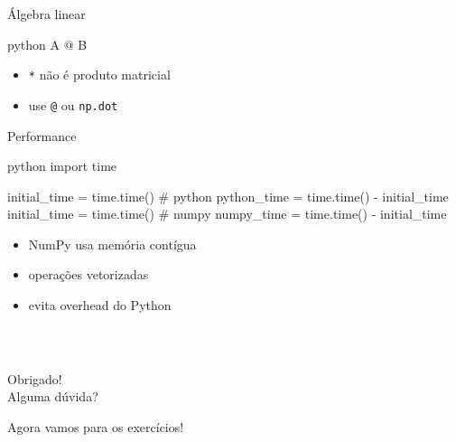 \documentclass[xcolor=dvipsnames,t,aspectratio=169]{beamer}
\newcommand{\highlight}[1]{{\color{nes_dark_orange} #1}}
\begin{document}
\begin{frame}[c, fragile]{Álgebra linear}

\begin{code}[Produto]{python}
A @ B
\end{code}

\begin{itemize}
\item \texttt{*} não é produto matricial
\item use \texttt{@} ou \texttt{np.dot}
\end{itemize}

\end{frame}

\begin{frame}[c, fragile]{Performance}

\begin{code}[Benchmark]{python}
import time

initial_time = time.time()
# python
python_time = time.time() - initial_time
initial_time = time.time()
# numpy
numpy_time = time.time() - initial_time
\end{code}

\begin{itemize}
\item NumPy usa memória contígua
\item operações vetorizadas
\item evita overhead do Python
\end{itemize}

\end{frame}


\begin{frame}
    \frametitle{~}
        \vfill
        \begin{center}
            {\Huge Obrigado!}\vspace{1.5em}\\
            {\Large \highlight{Alguma dúvida?}}\\
        \end{center}
        \vfill
        \begin{center}
            {\small Agora vamos para os exercícios!}
        \end{center}
\end{frame}
\end{document}
